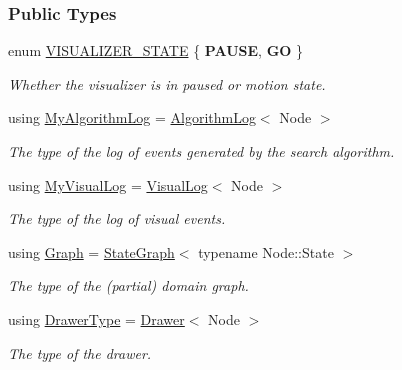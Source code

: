 \subsubsection*{Public Types}
\begin{DoxyCompactItemize}
\item 
enum \hyperlink{structVisualizerData_a2384b80db05920ce2bdddab4fad53a47}{V\+I\+S\+U\+A\+L\+I\+Z\+E\+R\+\_\+\+S\+T\+A\+TE} \{ {\bfseries P\+A\+U\+SE}, 
{\bfseries GO}
 \}\hypertarget{structVisualizerData_a2384b80db05920ce2bdddab4fad53a47}{}\label{structVisualizerData_a2384b80db05920ce2bdddab4fad53a47}
\begin{DoxyCompactList}\small\item\em Whether the visualizer is in paused or motion state. \end{DoxyCompactList}
\item 
using \hyperlink{structVisualizerData_a7e068bb878ca92434a498e72717c8800}{My\+Algorithm\+Log} = \hyperlink{structAlgorithmLog}{Algorithm\+Log}$<$ Node $>$\hypertarget{structVisualizerData_a7e068bb878ca92434a498e72717c8800}{}\label{structVisualizerData_a7e068bb878ca92434a498e72717c8800}

\begin{DoxyCompactList}\small\item\em The type of the log of events generated by the search algorithm. \end{DoxyCompactList}\item 
using \hyperlink{structVisualizerData_a6cd4b3f0a572ec341c19cb0c0dc3751a}{My\+Visual\+Log} = \hyperlink{structVisualLog}{Visual\+Log}$<$ Node $>$\hypertarget{structVisualizerData_a6cd4b3f0a572ec341c19cb0c0dc3751a}{}\label{structVisualizerData_a6cd4b3f0a572ec341c19cb0c0dc3751a}

\begin{DoxyCompactList}\small\item\em The type of the log of visual events. \end{DoxyCompactList}\item 
using \hyperlink{structVisualizerData_a22f7b99d8e45a9bcc56771efd611f5e3}{Graph} = \hyperlink{structStateGraph}{State\+Graph}$<$ typename Node\+::\+State $>$\hypertarget{structVisualizerData_a22f7b99d8e45a9bcc56771efd611f5e3}{}\label{structVisualizerData_a22f7b99d8e45a9bcc56771efd611f5e3}

\begin{DoxyCompactList}\small\item\em The type of the (partial) domain graph. \end{DoxyCompactList}\item 
using \hyperlink{structVisualizerData_ae68cf5e12f7a5c784c906194ca822f05}{Drawer\+Type} = \hyperlink{structDrawer}{Drawer}$<$ Node $>$\hypertarget{structVisualizerData_ae68cf5e12f7a5c784c906194ca822f05}{}\label{structVisualizerData_ae68cf5e12f7a5c784c906194ca822f05}

\begin{DoxyCompactList}\small\item\em The type of the drawer. \end{DoxyCompactList}\end{DoxyCompactItemize}
